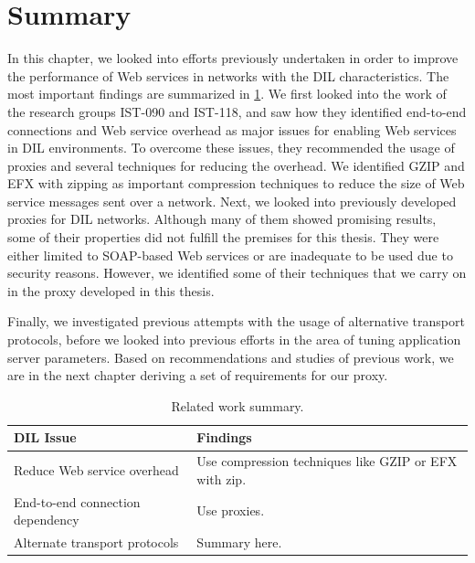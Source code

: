 \section{Summary}

In this chapter, we looked into efforts previously undertaken in order to improve
the performance of Web services in networks with the DIL characteristics. The
most important findings are summarized in \cref{table:related-work-summary}. We
first looked into the work of the research groups IST-090 and IST-118, and saw
how they identified end-to-end connections and Web service overhead as major
issues for enabling Web services in DIL environments. To overcome these issues,
they recommended the usage of proxies and several techniques for reducing the
overhead. We identified GZIP and EFX with zipping as important compression
techniques to reduce the size of Web service messages sent over a network. Next,
we looked into previously developed proxies for DIL networks. Although many of
them showed promising results, some of their properties did not fulfill the
premises for this thesis. They were either limited to SOAP-based Web services or
are inadequate to be used due to security reasons. However, we identified some
of their techniques that we carry on in the proxy developed in this thesis.

Finally, we investigated previous attempts with the usage of alternative
transport protocols, before we looked into previous efforts in the area of
tuning application server parameters. Based on recommendations and studies of
previous work, we are in the next chapter deriving a set of requirements for our
proxy.

\begin{table}[h]
\begin{tabularx}{\textwidth}{| X | X |}
\hline
  \textbf{DIL Issue} & \textbf{Findings} \\ \hline

  Reduce Web service overhead  & Use compression techniques like GZIP or EFX
  with zip.\\ \hline

  End-to-end connection dependency & Use proxies. \\ \hline

  Alternate transport protocols & Summary here. \\ \hline
\end{tabularx}
\caption{Related work summary.}
\label{table:related-work-summary}
\end{table}
